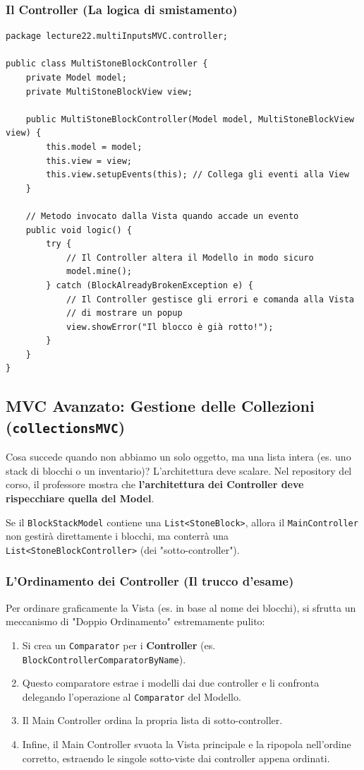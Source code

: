 \documentclass[12pt, a4paper]{article}
\begin{document}
\newpage

\subsubsection{Il Controller (La logica di smistamento)}
\begin{verbatim}
package lecture22.multiInputsMVC.controller;

public class MultiStoneBlockController {
    private Model model;
    private MultiStoneBlockView view;

    public MultiStoneBlockController(Model model, MultiStoneBlockView view) {
        this.model = model;
        this.view = view;
        this.view.setupEvents(this); // Collega gli eventi alla View
    }

    // Metodo invocato dalla Vista quando accade un evento
    public void logic() {
        try {
            // Il Controller altera il Modello in modo sicuro
            model.mine(); 
        } catch (BlockAlreadyBrokenException e) {
            // Il Controller gestisce gli errori e comanda alla Vista 
            // di mostrare un popup
            view.showError("Il blocco è già rotto!"); 
        }
    }
}
\end{verbatim}

\subsection{MVC Avanzato: Gestione delle Collezioni (\texttt{collectionsMVC})}
Cosa succede quando non abbiamo un solo oggetto, ma una lista intera (es. uno stack di blocchi o un inventario)? L'architettura deve scalare. Nel repository del corso, il professore mostra che \textbf{l'architettura dei Controller deve rispecchiare quella del Model}. 

Se il \texttt{BlockStackModel} contiene una \texttt{List<StoneBlock>}, allora il \texttt{MainController} non gestirà direttamente i blocchi, ma conterrà una \texttt{List<StoneBlockController>} (dei "sotto-controller").

\newpage

\subsubsection{L'Ordinamento dei Controller (Il trucco d'esame)}
Per ordinare graficamente la Vista (es. in base al nome dei blocchi), si sfrutta un meccanismo di "Doppio Ordinamento" estremamente pulito:
\begin{enumerate}
    \item Si crea un \texttt{Comparator} per i \textbf{Controller} (es. \texttt{BlockControllerComparatorByName}).
    \item Questo comparatore estrae i modelli dai due controller e li confronta delegando l'operazione al \texttt{Comparator} del Modello.
    \item Il Main Controller ordina la propria lista di sotto-controller.
    \item Infine, il Main Controller svuota la Vista principale e la ripopola nell'ordine corretto, estraendo le singole sotto-viste dai controller appena ordinati.
\end{enumerate}
\end{document}
